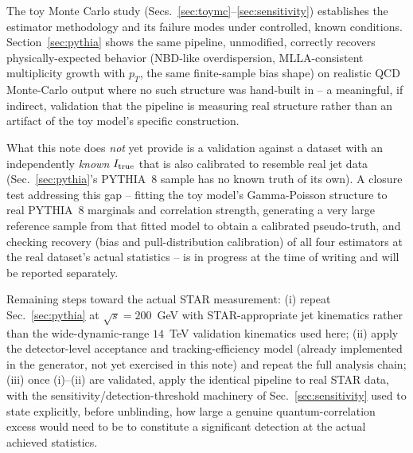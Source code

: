 \documentclass[11pt]{article}
\begin{document}
The toy Monte Carlo study (Secs.~\ref{sec:toymc}--\ref{sec:sensitivity})
establishes the estimator methodology and its failure modes under
controlled, known conditions. Section~\ref{sec:pythia} shows the same
pipeline, unmodified, correctly recovers physically-expected behavior
(NBD-like overdispersion, MLLA-consistent multiplicity growth with $p_T$,
the same finite-sample bias shape) on realistic QCD Monte-Carlo output
where no such structure was hand-built in -- a meaningful, if indirect,
validation that the pipeline is measuring real structure rather than an
artifact of the toy model's specific construction.

What this note does \emph{not} yet provide is a validation against a
dataset with an independently \emph{known} $I_{\rm true}$ that is also
calibrated to resemble real jet data (Sec.~\ref{sec:pythia}'s PYTHIA~8
sample has no known truth of its own). A closure test addressing this gap
-- fitting the toy model's Gamma-Poisson structure to real PYTHIA~8
marginals and correlation strength, generating a very large reference
sample from that fitted model to obtain a calibrated pseudo-truth, and
checking recovery (bias and pull-distribution calibration) of all four
estimators at the real dataset's actual statistics -- is in progress at
the time of writing and will be reported separately.

Remaining steps toward the actual STAR measurement: (i) repeat
Sec.~\ref{sec:pythia} at $\sqrt{s}=200$~GeV with STAR-appropriate jet
kinematics rather than the wide-dynamic-range $14$~TeV validation
kinematics used here; (ii) apply the detector-level acceptance and
tracking-efficiency model (already implemented in the generator, not yet
exercised in this note) and repeat the full analysis chain; (iii) once
(i)--(ii) are validated, apply the identical pipeline to real STAR data,
with the sensitivity/detection-threshold machinery of
Sec.~\ref{sec:sensitivity} used to state explicitly, before unblinding,
how large a genuine quantum-correlation excess would need to be to
constitute a significant detection at the actual achieved statistics.
\end{document}
